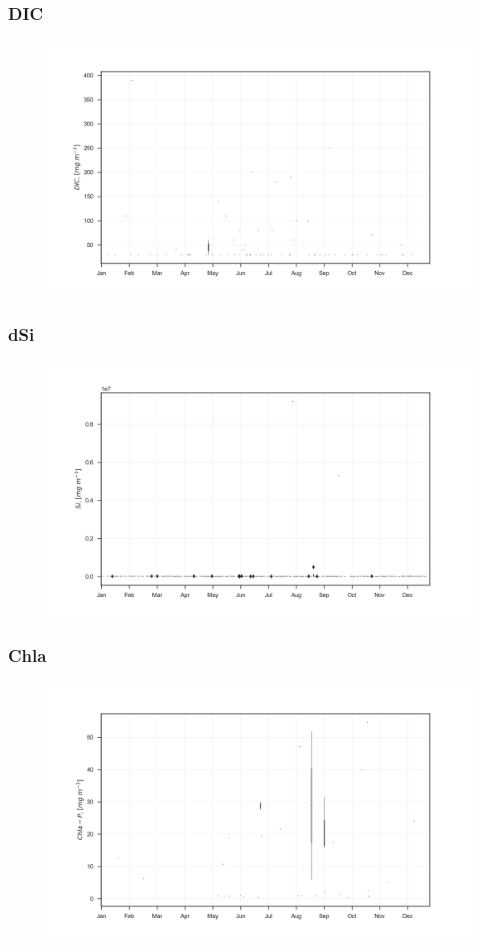 \documentclass{beamer}
\begin{document}
\begin{frame}
\frametitle{DIC}
\begin{figure}
\includegraphics[width=\textwidth]{rivers/all/1yr_boxpl/DIC.png}
\end{figure}
\end{frame}

\begin{frame}
\frametitle{dSi}
\begin{figure}
\includegraphics[width=\textwidth]{rivers/all/1yr_boxpl/dSi.png}
\end{figure}
\end{frame}

\begin{frame}
\frametitle{Chla}
\begin{figure}
\includegraphics[width=\textwidth]{rivers/all/1yr_boxpl/Chla.png}
\end{figure}
\end{frame}
\end{document}
